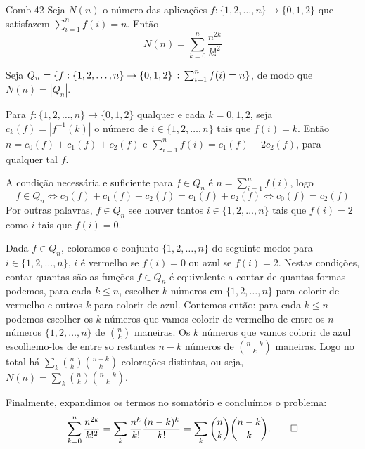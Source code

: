 \documentclass[repertorio-solutions-1.tex]{subfiles}
\newcommand*{\sets}{\{0,1,2\}}
\newcommand*{\setn}{\{1,2,\dots,n\}}
\begin{document}
\begin{problem}{Comb 42}
Seja $N(n)$ o número das aplicações
$f:\setn\to\sets$
que satisfazem $\sum_{i=1}^n f(i)=n$.
Então
$$N(n)=\sum_{k=0}^n\frac{n^{2k}}{k!^2}$$
\end{problem}

\begin{solution}
Seja $Q_n=\{f:\setn\to\sets\suchthat\sum_{i=1}^n f(i)=n\}$,
de modo que $N(n)=|Q_n|$.

Para $f:\setn\to\sets$
qualquer e cada $k=0,1,2$, seja $c_k(f)=|f^{-1}(k)|$
o número de $i\in\setn$ tais que $f(i)=k$.
Então $n=c_0(f)+c_1(f)+c_2(f)$ e $\sum_{i=1}^n f(i)=
c_1(f)+2c_2(f)$, para qualquer tal $f$.

A condição necessária e suficiente para $f\in Q_n$ é
$n=\sum_{i=1}^n f(i)$, logo
\begin{equation*}
f\in Q_n
\Leftrightarrow c_0(f)+c_1(f)+c_2(f)=c_1(f)+c_2(f)
\Leftrightarrow c_0(f)=c_2(f)
\end{equation*}
Por outras palavras, $f\in Q_n$ see houver tantos
$i\in\setn$ tais que $f(i)=2$ como $i$
tais que $f(i)=0$.

Dada $f\in Q_n$, coloramos o conjunto $\setn$
do seguinte modo: para $i\in\setn$, $i$ é
vermelho se $f(i)=0$ ou azul se $f(i)=2$. Nestas
condições, contar quantas são as funções $f\in Q_n$
é equivalente a contar de quantas formas podemos, para
cada $k\leq n$, escolher $k$ números em $\setn$
para colorir de vermelho e outros $k$ para colorir de azul. Contemos então: para cada $k\leq n$ podemos escolher os $k$ números que vamos colorir de vermelho de entre os $n$ números $\setn$ de $\binom{n}{k}$ maneiras. Os $k$ números que vamos colorir de azul escolhemo-los de entre so restantes $n-k$ números de $\binom{n-k}{k}$ maneiras. Logo no total há $\sum_k\binom{n}{k}\binom{n-k}{k}$ colorações distintas, ou seja, $N(n)=\sum_k\binom{n}{k}\binom{n-k}{k}$.

Finalmente, expandimos os termos no somatório e concluímos o problema:
\begin{equation*}
\sum_{k=0}^n\frac{n^{2k}}{k!^2}
=\sum_k\frac{n^k}{k!}\frac{(n-k)^k}{k!}
=\sum_k\binom{n}{k}\binom{n-k}{k}.\qedhere
\end{equation*}
\end{solution}
\end{document}
